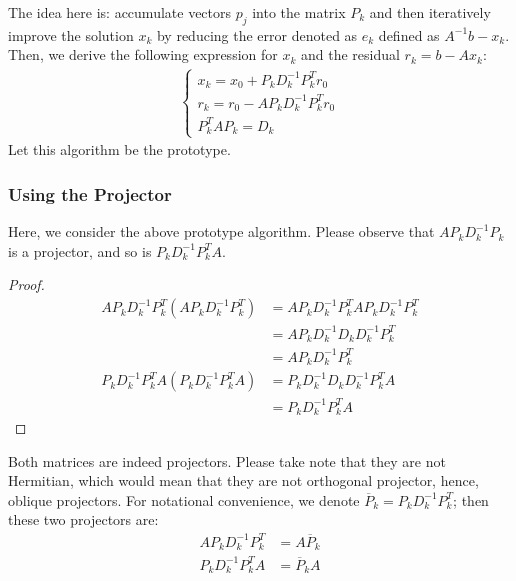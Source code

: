 \documentclass[]{article}
\theoremstyle{definition}
\begin{document}
            The idea here is: accumulate vectors $p_j$ into the matrix $P_k$ and then iteratively improve the solution $x_k$ by reducing the error denoted as $e_k$ defined as $A^{-1}b - x_k$. Then, we derive the following expression for $x_k$ and the residual $r_k = b - Ax_k$: 
            \begin{align}
                \begin{cases}
                    x_k = x_0 + P_kD^{-1}_kP^T_kr_0
                    \\
                    r_k = r_0 - AP_kD^{-1}_kP^T_k r_0
                    \\
                    P^T_kAP_k = D_k
                \end{cases}
            \end{align}
            Let this algorithm be the prototype. 
        \subsubsection{Using the Projector}
            Here, we consider the above prototype algorithm. Please observe that $AP_kD_k^{-1}P_k$ is a projector, and so is $P_kD^{-1}_kP_k^TA$. 
            \begin{proof}
                \begin{align}
                    AP_kD^{-1}_kP_k^T(AP_kD^{-1}_kP_k^T) &= AP_kD^{-1}_kP_k^TAP_kD^{-1}_kP_k^T 
                    \\
                    &= AP_kD_k^{-1}D_kD_k^{-1}P_k^{T}
                    \\
                    &= AP_kD_k^{-1}P_k^T 
                    \\[1.1em]
                    P_kD^{-1}_kP_k^{T}A(P_kD^{-1}_kP_k^{T}A) &= P_kD^{-1}_kD_kD_{k}^{-1}P^T_kA
                    \\
                    &= 
                    P_kD^{-1}_kP^T_kA
                \end{align}
            \end{proof}
            \noindent
            Both matrices are indeed projectors. Please take note that they are not Hermitian, which would mean that they are not orthogonal projector, hence, oblique projectors. For notational convenience, we denote $\overline{P}_k = P_kD_k^{-1}P_k^{T}$; then these two projectors are: 
            \begin{align}
                AP_kD^{-1}_kP_k^T &= A\overline{P}_k 
                \\
                P_kD^{-1}_kP_k^TA &= \overline{P}_kA
            \end{align}
\end{document}
